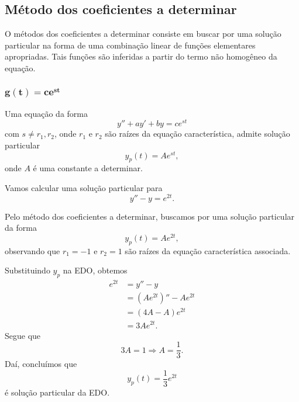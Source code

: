 \subsection{Método dos coeficientes a determinar}\label{subsec:edolin_o2_mcc}

O métodos dos coeficientes a determinar consiste em buscar por uma solução particular na forma de uma combinação linear de funções elementares apropriadas. Tais funções são inferidas a partir do termo não homogêneo da equação.

\subsubsection{$\pmb{g(t) = ce^{st}}$}

Uma equação da forma
\begin{equation}
  y'' + ay' + by = ce^{st}
\end{equation}
com $s\neq r_1,r_2$, onde $r_1$ e $r_2$ são raízes da equação característica, admite solução particular
\begin{equation}
  y_p(t) = Ae^{st},
\end{equation}
onde $A$ é uma constante a determinar.

\begin{ex}
  Vamos calcular uma solução particular para
  \begin{equation}
    y'' - y = e^{2t}.
  \end{equation}

  Pelo método dos coeficientes a determinar, buscamos por uma solução particular da forma
  \begin{equation}
    y_p(t) = Ae^{2t},
  \end{equation}
  observando que $r_1=-1$ e $r_2=1$ são raízes da equação característica associada.

  Substituindo $y_p$ na EDO, obtemos
  \begin{align}
    e^{2t} &= y'' - y \\
           &= \left(Ae^{2t}\right)'' - Ae^{2t} \\
           &= (4A - A)e^{2t} \\
           &= 3Ae^{2t}.
  \end{align}
  Segue que
  \begin{equation}
    3A = 1 \Rightarrow A = \frac{1}{3}.
  \end{equation}
  Daí, concluímos que
  \begin{equation}
    y_p(t) = \frac{1}{3}e^{2t}
  \end{equation}
  é solução particular da EDO.
\end{ex}

